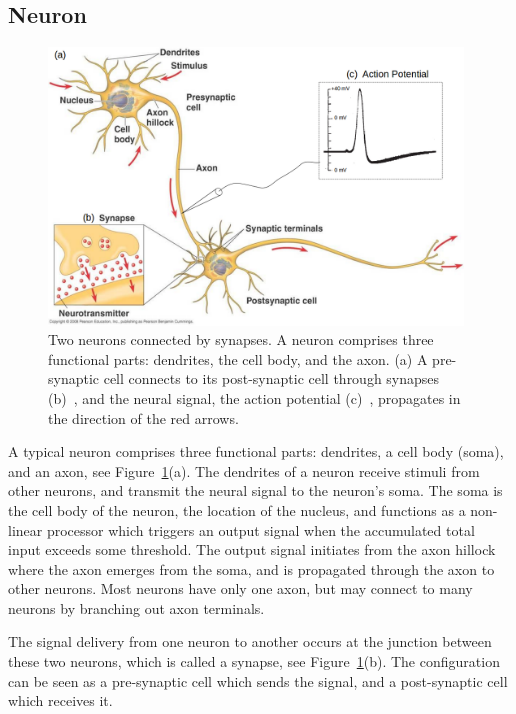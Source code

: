 \subsection{Neuron}
	\begin{figure}[bt]
	\centering
	\includegraphics[width=0.98\textwidth]{pics_snn/neuron2.png}
	\caption{Two neurons connected by synapses. 
		A neuron comprises three functional parts: dendrites, the cell body, and the axon. (a) A pre-synaptic cell connects to its post-synaptic cell through synapses (b)~\citep{reece2011campbell}, and the neural signal, the action potential (c)~\citep{hodgkin1939action}, propagates in the direction of the red arrows. }
	\label{Fig:neuron_basic}
\end{figure}

A typical neuron comprises three functional parts: dendrites, a cell body (soma), and an axon, see Figure~\ref{Fig:neuron_basic}(a).
The dendrites of a neuron receive stimuli from other neurons, and transmit the neural signal to the neuron's soma.
The soma is the cell body of the neuron, the location of the nucleus, and functions as a non-linear processor which triggers an output signal when the accumulated total input exceeds some threshold.
The output signal initiates from the axon hillock where the axon emerges from the soma, and is propagated through the axon to other neurons.
Most neurons have only one axon, but may connect to many neurons by branching out axon terminals. 


The signal delivery from one neuron to another occurs at the junction between these two neurons, which is called a synapse, see Figure~\ref{Fig:neuron_basic}(b).
The configuration can be seen as a pre-synaptic cell which sends the signal, and a post-synaptic cell which receives it.

